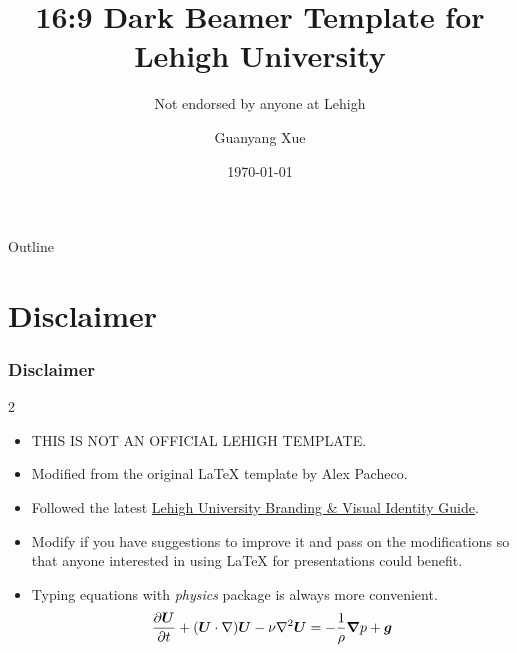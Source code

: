 \documentclass[11pt,t,aspectratio=169]{beamer}
\title{16:9 Dark Beamer Template for Lehigh University}
\subtitle{Not endorsed by anyone at Lehigh}
\author{Guanyang Xue}
\institute{Lehigh University}
\date{\today}
\begin{document}
\begin{frame}
    \titlepage
\end{frame}

\begin{frame}[c]{Outline}
    \tableofcontents
\end{frame}

\section{Disclaimer}
\begin{frame}[c]
\frametitle{Disclaimer}
    \begin{multicols}{2}
    \begin{itemize}
        \item THIS IS NOT AN OFFICIAL LEHIGH TEMPLATE.
        \item Modified from the original \LaTeX{} template by Alex Pacheco.
        \item Followed the latest \href{https://www.lehigh.edu/~inis/sdownloads/Lehigh-Brand-Visual-Guide.pdf}{Lehigh University Branding \& Visual Identity Guide}.
        \item Modify if you have suggestions to improve it and pass on the modifications so that anyone interested in using \LaTeX{} for presentations could benefit.
        \end{itemize}
    \end{multicols}
    \begin{itemize}
        \item Typing equations with \emph{physics} package is always more convenient.
        $$\pdv{\vb*{U}}{t}+(\vb*{U}\cdot\nabla)\vb*{U}-\nu\laplacian\vb*{U} =-\frac{1}{\rho }\grad p+\vb*{g}$$
    \end{itemize}
\end{frame}
\end{document}
